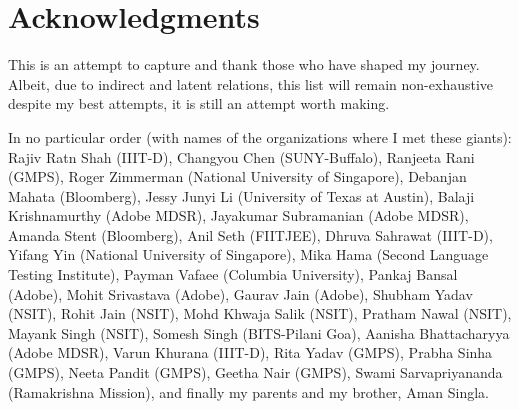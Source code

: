 \documentclass[hidelinks,11pt,a4paper]{report}
\begin{document}

\clearpage













\chapter*{Acknowledgments}

This is an attempt to capture and thank those who have shaped my journey. Albeit, due to indirect and latent relations, this list will remain non-exhaustive despite my best attempts, it is still an attempt worth making.

In no particular order (with names of the organizations where I met these giants): Rajiv Ratn Shah (IIIT-D), Changyou Chen (SUNY-Buffalo), Ranjeeta Rani (GMPS), Roger Zimmerman (National University of Singapore), Debanjan Mahata (Bloomberg), Jessy Junyi Li (University of Texas at Austin), Balaji Krishnamurthy (Adobe MDSR), Jayakumar Subramanian (Adobe MDSR), Amanda Stent (Bloomberg), Anil Seth (FIITJEE), Dhruva Sahrawat (IIIT-D), Yifang Yin (National University of Singapore), Mika Hama (Second Language Testing Institute), Payman Vafaee (Columbia University), Pankaj Bansal (Adobe), Mohit Srivastava (Adobe), Gaurav Jain (Adobe), Shubham Yadav (NSIT), Rohit Jain (NSIT), Mohd Khwaja Salik (NSIT), Pratham Nawal (NSIT), Mayank Singh (NSIT), Somesh Singh (BITS-Pilani Goa), Aanisha Bhattacharyya (Adobe MDSR), Varun Khurana (IIIT-D), Rita Yadav (GMPS), Prabha Sinha (GMPS), Neeta Pandit (GMPS), Geetha Nair (GMPS), Swami Sarvapriyananda (Ramakrishna Mission), and finally my parents and my brother, Aman Singla.
\end{document}
